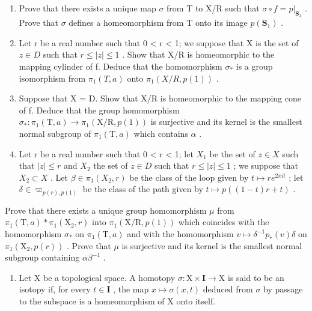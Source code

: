 \begin{enumerate}
\def\labelenumi{\alph{enumi})}
\item
  Prove that there exists a unique map \(\sigma\) from T to X/R such that \(\sigma \circ f = p|_{\mathbf{S}_1}\) . Prove that \(\sigma\) defines a homeomorphism from T onto its image \(p(\mathbf{S}_1)\) .
\item
  Let r be a real number such that 0 \textless{} r \textless{} 1; we suppose that X is the set of \(z \in D\) such that \(r \leqslant |z| \leqslant 1\) . Show that X/R is homeomorphic to the mapping cylinder of f. Deduce that the homomorphism \(\sigma_{*}\) is a group isomorphism from \(\pi_{1}(T, a)\) onto \(\pi_{1}(X/R, p(1))\) .
\item
  Suppose that X = D. Show that X/R is homeomorphic to the mapping cone of f. Deduce that the group homomorphism \(\sigma_{*}\colon\pi_{1}(\mathrm{T},a)\to\pi_{1}(\mathrm{X}/\mathrm{R},p(1))\) is surjective and its kernel is the smallest normal subgroup of \(\pi_{1}(\mathrm{T},a)\) which contains \(\alpha\) .
\item
  Let r be a real number such that 0 \textless{} r \textless{} 1; let \(X_{1}\) be the set of \(z \in X\) such that \(|z| \leqslant r\) and \(X_{2}\) the set of \(z \in D\) such that \(r \leqslant |z| \leqslant 1\) ; we suppose that \(X_{2} \subset X\) . Let \(\beta \in \pi_{1}(X_{2}, r)\) be the class of the loop given by \(t \mapsto re^{2\pi it}\) ; let \(\delta \in \varpi_{p(r), p(1)}\) be the class of the path given by \(t \mapsto p((1 - t)r + t)\) .
\end{enumerate}

  Prove that there exists a unique group homomorphism \(\mu\) from \(\pi_1(\mathrm{T},a)*\pi_1(\mathrm{X}_2,r)\) into \(\pi_1(\mathrm{X} / \mathrm{R},p(1))\) which coincides with the homomorphism \(\sigma_*\) on \(\pi_1(\mathrm{T},a)\) and with the homomorphism \(v\mapsto \delta^{-1}p_{*}(v)\delta\) on \(\pi_1(\mathrm{X}_2,p(r))\) . Prove that \(\mu\) is surjective and its kernel is the smallest normal subgroup containing \(\alpha \beta^{-1}\) .

\begin{enumerate}
\def\labelenumi{\arabic{enumi})}
\setcounter{enumi}{27}
\tightlist
\item
  Let X be a topological space. A homotopy \(\sigma: \mathrm{X} \times \mathbf{I} \to \mathrm{X}\) is said to be an isotopy if, for every \(t \in \mathbf{I}\) , the map \(x \mapsto \sigma(x, t)\) deduced from \(\sigma\) by passage to the subspace is a homeomorphism of X onto itself.
\end{enumerate}

